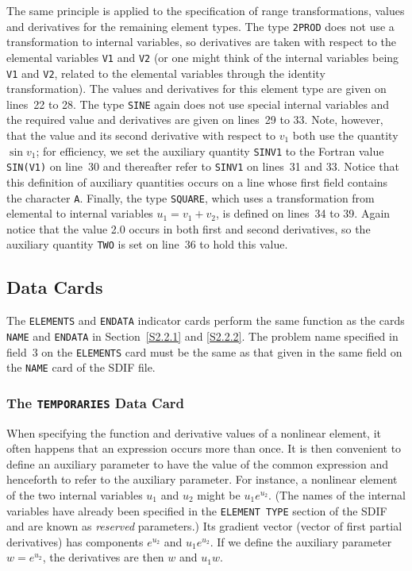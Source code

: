 \documentclass[a4paper]{article}
\begin{document}
The same principle   is applied     to  the specification   of   range
transformations,
values   and derivatives
for  the  remaining element
types. The type {\tt 2PROD} does not use a transformation  to internal
variables, so derivatives
are  taken  with respect to the   elemental variables
{\tt V1} and  {\tt V2} (or  one  might think of the internal
variables
 being {\tt V1}   and {\tt  V2},  related to  the  elemental
variables through the   identity  transformation).
The values    and
derivatives for  this element type
are given  on lines~22  to  28. The
type {\tt SINE} again does not use special internal  variables and the
required value and  derivatives are given  on lines~29 to  33.   Note,
however, that  the value and   its second derivative with  respect  to
$v_1$ both use  the quantity $\sin  v_1$; for  efficiency, we set  the
auxiliary quantity {\tt  SINV1} to the Fortran
value  {\tt SIN(V1)} on
line~30  and  thereafter refer  to {\tt SINV1}   on lines~31  and  33.
Notice that this  definition of auxiliary  quantities occurs on a line
whose first field contains  the  character {\tt A}.
Finally,  the type  {\tt  SQUARE},  which  uses a transformation from
elemental  to internal  variables  $u_1 =  v_1  + v_2$,  is defined on
lines~34 to 39. Again notice that the value {2.0} occurs in both first
and second derivatives,
so the auxiliary quantity {\tt TWO} is  set on
line~36 to hold this value.

\subsection{\label{S3.2}Data Cards}

The {\tt ELEMENTS}
and {\tt ENDATA}
indicator cards
perform the same function as the cards {\tt NAME}
and {\tt ENDATA}
in Section~\ref{S2.2.1} and \ref{S2.2.2}.   The problem name
specified in field~3 on the {\tt ELEMENTS}
card  must be the  same as that given
in the same field on the {\tt NAME}
card of the SDIF file.

\subsubsection{\label{S3.2.1}The {\tt TEMPORARIES} Data Card}

When specifying  the function  and  derivative
values of  a  nonlinear element,
it  often happens that an expression  occurs more  than once.
It  is  then convenient to define an  auxiliary  parameter
to have the
value of  the  common  expression and  henceforth   to refer  to   the
auxiliary parameter.  For  instance, a  nonlinear  element  of the two
internal variables $u_1$ and $u_2$ might  be $u_1 e^{u_2}.$ (The names
of the  internal  variables
have  already  been specified in  the {\tt ELEMENT TYPE}
section of the SDIF and are known as {\em  reserved} parameters.)
Its gradient
vector (vector  of first partial derivatives)
has  components
$e^{u_2}$ and $u_1 e^{u_2}$.  If  we define the auxiliary parameter
$w = e^{u_2}$, the derivatives
are then $w$ and $u_1 w$.
\end{document}
